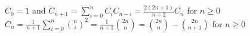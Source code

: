$C_{0}=1$ and $C_{n+1}=\sum_{i=0}^{n}C_{i}C_{n-i}=\frac{2(2n+1)}{n+2}C_{n}$ for $n\ge0$\\
$C_{n}=\frac{1}{n+1}\sum_{i=0}^{n}\binom{n}{i}^{2}=\frac{1}{n+1}\binom{2n}{n}=\binom{2n}{n}-\binom{2n}{n+1}$ for $n\ge0$

